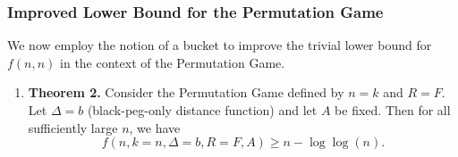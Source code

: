 \documentclass[12pt, a4paper]{article}
\begin{document}
	\subsubsection{Improved Lower Bound for the Permutation Game}
	We now employ the notion of a bucket to improve the trivial lower bound for $f(n, n)$ in the context of the Permutation Game.
	\begin{enumerate}[label=]
		\item\textbf{Theorem 2.} Consider the Permutation Game defined by $n = k$ and $R = F$. Let $\Delta = b$ (black-peg-only distance function) and let $A$ be fixed. Then for all sufficiently large $n$, we have
		\begin{equation*}
			f(n, k = n, \Delta = b, R = F, A) \ge n - \log\log(n).
		\end{equation*}
	\end{enumerate}
\end{document}
